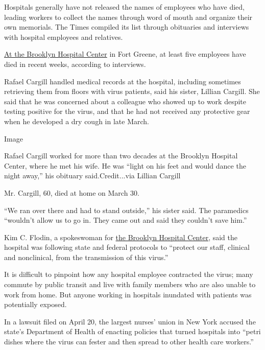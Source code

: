 Hospitals generally have not released the names of employees who have
died, leading workers to collect the names through word of mouth and
organize their own memorials. The Times compiled its list through
obituaries and interviews with hospital employees and relatives.

\href{https://www.nytimes3xbfgragh.onion/2020/03/26/nyregion/coronavirus-brooklyn-hospital.html}{At
the Brooklyn Hospital Center} in Fort Greene, at least five employees
have died in recent weeks, according to interviews.

Rafael Cargill handled medical records at the hospital, including
sometimes retrieving them from floors with virus patients, said his
sister, Lillian Cargill. She said that he was concerned about a
colleague who showed up to work despite testing positive for the virus,
and that he had not received any protective gear when he developed a dry
cough in late March.

Image

Rafael Cargill worked for more than two decades at the Brooklyn Hospital
Center, where he met his wife. He was ``light on his feet and would
dance the night away,'' his obituary said.Credit...via Lillian Cargill

Mr. Cargill, 60, died at home on March 30.

``We ran over there and had to stand outside,'' his sister said. The
paramedics ``wouldn't allow us to go in. They came out and said they
couldn't save him.''

Kim C. Flodin, a spokeswoman for
\href{https://www.nytimes3xbfgragh.onion/2020/04/12/nyregion/coronavirus-births-mothers.html}{the
Brooklyn Hospital Center}, said the hospital was following state and
federal protocols to ``protect our staff, clinical and nonclinical, from
the transmission of this virus.''

It is difficult to pinpoint how any hospital employee contracted the
virus; many commute by public transit and live with family members who
are also unable to work from home. But anyone working in hospitals
inundated with patients was potentially exposed.

In a lawsuit filed on April 20, the largest nurses' union in New York
accused the state's Department of Health of enacting policies that
turned hospitals into ``petri dishes where the virus can fester and then
spread to other health care workers.''

\href{https://www.nytimes3xbfgragh.onion/news-event/coronavirus?action=click\&pgtype=Article\&state=default\&region=MAIN_CONTENT_3\&context=storylines_faq}{}

